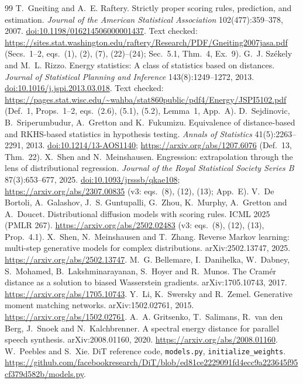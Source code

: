 \documentclass[11pt]{article}
\theoremstyle{definition}
\theoremstyle{remark}
\begin{document}
\begingroup\raggedright
\begin{thebibliography}{99}
 T.~Gneiting and A.~E. Raftery. Strictly proper scoring rules, prediction, and estimation.
\emph{Journal of the American Statistical Association} 102(477):359--378, 2007.
\href{https://doi.org/10.1198/016214506000001437}{doi:10.1198/016214506000001437}. Text checked:
\url{https://sites.stat.washington.edu/raftery/Research/PDF/Gneiting2007jasa.pdf} (Secs.~1--2, eqs.~(1), (2), (7), (22)--(24); Sec.~5.1, Thm.~4, Ex.~9).
 G.~J. Sz\'ekely and M.~L. Rizzo. Energy statistics: A class of statistics based on distances.
\emph{Journal of Statistical Planning and Inference} 143(8):1249--1272, 2013.
\href{https://doi.org/10.1016/j.jspi.2013.03.018}{doi:10.1016/j.jspi.2013.03.018}. Text checked:
\url{https://pages.stat.wisc.edu/~wahba/stat860public/pdf4/Energy/JSPI5102.pdf} (Def.~1, Props.~1--2, eqs.~(2.6), (5.1), (5.2), Lemma~1, App.~A).
 D.~Sejdinovic, B.~Sriperumbudur, A.~Gretton and K.~Fukumizu. Equivalence of
distance-based and RKHS-based statistics in hypothesis testing. \emph{Annals of Statistics} 41(5):2263--2291, 2013.
\href{https://doi.org/10.1214/13-AOS1140}{doi:10.1214/13-AOS1140}; \url{https://arxiv.org/abs/1207.6076} (Def.~13, Thm.~22).
 X.~Shen and N.~Meinshausen. Engression: extrapolation through the lens of distributional
regression. \emph{Journal of the Royal Statistical Society Series B} 87(3):653--677, 2025.
\href{https://doi.org/10.1093/jrsssb/qkae108}{doi:10.1093/jrsssb/qkae108}; \url{https://arxiv.org/abs/2307.00835} (v3: eqs.~(8), (12), (13); App.~E).
 V.~De Bortoli, A.~Galashov, J.~S. Guntupalli, G.~Zhou, K.~Murphy, A.~Gretton and
A.~Doucet. Distributional diffusion models with scoring rules. ICML 2025 (PMLR 267).
\url{https://arxiv.org/abs/2502.02483} (v3: eqs.~(8), (12), (13), Prop.~4.1).
 X.~Shen, N.~Meinshausen and T.~Zhang. Reverse Markov learning: multi-step generative
models for complex distributions. arXiv:2502.13747, 2025. \url{https://arxiv.org/abs/2502.13747}.
 M.~G. Bellemare, I.~Danihelka, W.~Dabney, S.~Mohamed, B.~Lakshminarayanan, S.~Hoyer and
R.~Munos. The Cram\'er distance as a solution to biased Wasserstein gradients. arXiv:1705.10743, 2017.
\url{https://arxiv.org/abs/1705.10743}.
 Y.~Li, K.~Swersky and R.~Zemel. Generative moment matching networks. arXiv:1502.02761, 2015.
\url{https://arxiv.org/abs/1502.02761}.
 A.~A. Gritsenko, T.~Salimans, R.~van den Berg, J.~Snoek and N.~Kalchbrenner. A spectral
energy distance for parallel speech synthesis. arXiv:2008.01160, 2020. \url{https://arxiv.org/abs/2008.01160}.
 W.~Peebles and S.~Xie. DiT reference code, \texttt{models.py},
\texttt{initialize\_weights}. \url{https://github.com/facebookresearch/DiT/blob/ed81ce2229091fd4ecc9a223645f95cf379d582b/models.py}.
\end{thebibliography}
\endgroup
\end{document}
